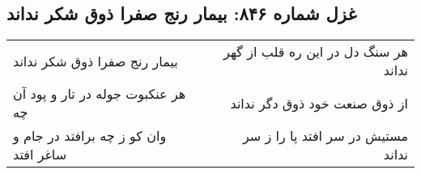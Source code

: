 \begin{center}
\section*{غزل شماره ۸۴۶: بیمار رنج صفرا ذوق شکر نداند}
\label{sec:0846}
\begin{longtable}{l p{0.5cm} r}
بیمار رنج صفرا ذوق شکر نداند
&&
هر سنگ دل در این ره قلب از گهر نداند
\\
هر عنکبوت جوله در تار و پود آن چه
&&
از ذوق صنعت خود ذوق دگر نداند
\\
وان کو ز چه برافتد در جام و ساغر افتد
&&
مستیش در سر افتد پا را ز سر نداند
\\
\end{longtable}
\end{center}
